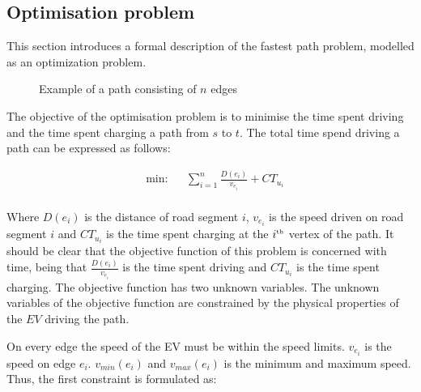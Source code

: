 \subsection{Optimisation problem}
This section introduces a formal description of the fastest path problem, modelled as an optimization problem.

\begin{figure}[h!]
\centering
    \caption{Example of a path consisting of $n$ edges} \label{fig:pathexample}
\end{figure}


The objective of the optimisation problem is to minimise the time spent driving
and the time spent charging a path from $s$ to $t$. The total time spend driving a path can be expressed as follows:

\begin{equation*}
\begin{aligned} &
{\text{min:}}
& & \sum_{i=1}^{n} \frac{D(e_i)}{v_{e_i}} + CT_{u_i} \\
\end{aligned}
\end{equation*}\label{eq:objfunction}

Where $D(e_i)$ is the distance of road segment $i$, $v_{e_i}$ is the speed driven on road segment $i$ and $CT_{u_i}$ is the time spent charging at the $i^{\text{\tiny th}}$ vertex of the path. It should be clear that the objective function of this problem is concerned with time, being that $\frac{D(e_i)}{v_{e_i}}$ is the time spent driving and $CT_{u_i}$ is the time spent charging. The objective function has two unknown variables. The unknown variables of the objective function are constrained by the physical properties of the $EV$ driving the path.

On every edge the speed of the EV must be within the speed limits. $v_{e_i}$ is the speed on edge $e_i$. $v_{min}(e_i)$ and $v_{max}(e_i)$ is the minimum and maximum speed. Thus, the first constraint is formulated as:

